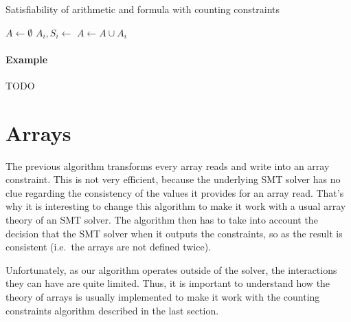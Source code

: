\documentclass[]{article}
\begin{document}
\begin{algorithm}[h]
\caption{Satisfiability of arithmetic and formula with counting constraints}
\begin{algorithmic}[1]
\State {}
    \State {}
    \State $A \gets \emptyset$
        \State $A_i, S_i \gets $ 
        \State $A \gets A \cup A_i$
            \State {}
            \State {}
        \EndIf
    \EndFor
    \State {}
    \State {}
    \State {}
    \State {}
    \State {}
    \State {}
        \State {}
        \State {}
    \EndIf
    \State {}
    \State {}
\EndWhile
\State {}
\end{algorithmic}
\label{arrayalgo}
\end{algorithm}

\paragraph{Example}\label{example-1}

TODO

\section{Arrays}\label{arrays}

The previous algorithm transforms every array reads and write into an
array constraint. This is not very efficient, because the underlying SMT
solver has no clue regarding the consistency of the values it provides
for an array read. That's why it is interesting to change this algorithm
to make it work with a usual array theory of an SMT solver. The
algorithm then has to take into account the decision that the SMT solver
when it outputs the constraints, so as the result is consistent
(i.e.~the arrays are not defined twice).

Unfortunately, as our algorithm operates outside of the solver, the
interactions they can have are quite limited. Thus, it is important to
understand how the theory of arrays is usually implemented to make it
work with the counting constraints algorithm described in the last
section.
\end{document}
